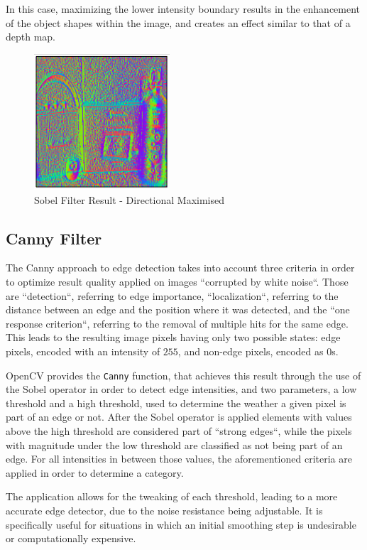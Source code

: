 In this case, maximizing the lower intensity boundary results in the enhancement of the object shapes within
the image, and creates an effect similar to that of a depth map.

\begin{figure}[H]
	\includegraphics[width=0.45\textwidth, height=0.45\textwidth]{resources/Sobel_4.png}
	\caption{Sobel Filter Result - Directional Maximised}
\end{figure}

\subsection{Canny Filter}

The Canny approach to edge detection takes into account three criteria in order to optimize result quality
applied on images ``corrupted by white noise``. Those are ``detection``, referring to edge importance,
``localization``, referring to the distance between an edge and the position where it was detected, and the
``one response criterion``, referring to the removal of multiple hits for the same edge. This leads to the
resulting image pixels having only two possible states: edge pixels, encoded with an intensity of \(255\), and
non-edge pixels, encoded as 0s.

OpenCV provides the \verb|Canny| function, that achieves this result through the use of the Sobel operator
in order to detect edge intensities, and two parameters, a low threshold and a high threshold, used to
determine the weather a given pixel is part of an edge or not. After the Sobel operator is applied
elements with values above the high threshold are considered part of ``strong edges``, while the pixels with
magnitude under the low threshold are classified as not being part of an edge. For all intensities in between
those values, the aforementioned criteria are applied in order to determine a category.

The application allows for the tweaking of each threshold, leading to a more accurate edge detector, due to
the noise resistance being adjustable. It is specifically useful for situations in which an initial smoothing
step is undesirable or computationally expensive.

